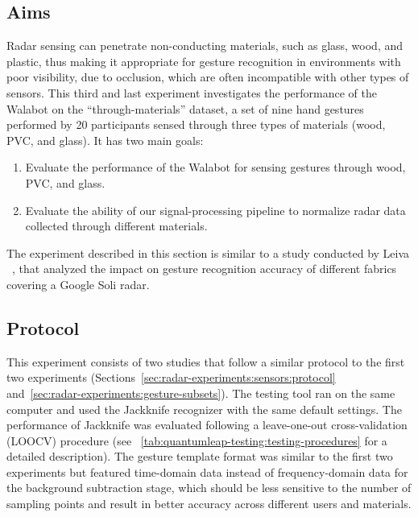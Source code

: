\subsection{Aims} \label{sec:radar-experiments:through-materials:aims}
Radar sensing can penetrate non-conducting materials, such as glass, wood, and plastic, thus making it appropriate for gesture recognition in environments with poor visibility, \eg due to occlusion, which are often incompatible with other types of sensors. This third and last experiment investigates the performance of the Walabot on the ``through-materials'' dataset, a set of nine hand gestures performed by 20 participants sensed through three types of materials (wood, PVC, and glass). It has two main goals:
\begin{enumerate}
    \item Evaluate the performance of the Walabot for sensing gestures through wood, PVC, and glass.
    \item Evaluate the ability of our signal-processing pipeline to normalize radar data collected through different materials.
\end{enumerate}
The experiment described in this section is similar to a study conducted by Leiva \etal~\cite{Leiva:2020}, that analyzed the impact on gesture recognition accuracy of different fabrics covering a Google Soli radar. 

\subsection{Protocol} \label{sec:radar-experiments:through-materials:protocol}
This experiment consists of two studies that follow a similar protocol to the first two experiments (Sections~\ref{sec:radar-experiments:sensors:protocol} and~\ref{sec:radar-experiments:gesture-subsets}). The \ql testing tool ran on the same computer and used the Jackknife recognizer with the same default settings. The performance of Jackknife was evaluated following a leave-one-out cross-validation (LOOCV) procedure (see \tab~\ref{tab:quantumleap-testing:testing-procedures} for a detailed description).
The gesture template format was similar to the first two experiments but featured time-domain data instead of frequency-domain data for the background subtraction stage, which should be less sensitive to the number of sampling points and result in better accuracy across different users and materials. 

